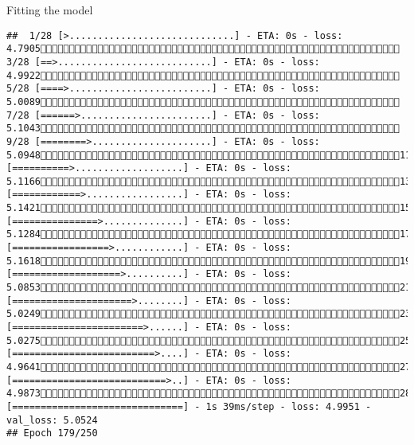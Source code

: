 \documentclass[
  ignorenonframetext,
]{beamer}
\begin{document}
\begin{frame}[fragile]{Fitting the model}
\begin{verbatim}
##  1/28 [>.............................] - ETA: 0s - loss: 4.7905 3/28 [==>...........................] - ETA: 0s - loss: 4.9922 5/28 [====>.........................] - ETA: 0s - loss: 5.0089 7/28 [======>.......................] - ETA: 0s - loss: 5.1043 9/28 [========>.....................] - ETA: 0s - loss: 5.094811/28 [==========>...................] - ETA: 0s - loss: 5.116613/28 [============>.................] - ETA: 0s - loss: 5.142115/28 [===============>..............] - ETA: 0s - loss: 5.128417/28 [=================>............] - ETA: 0s - loss: 5.161819/28 [===================>..........] - ETA: 0s - loss: 5.085321/28 [=====================>........] - ETA: 0s - loss: 5.024923/28 [=======================>......] - ETA: 0s - loss: 5.027525/28 [=========================>....] - ETA: 0s - loss: 4.964127/28 [===========================>..] - ETA: 0s - loss: 4.987328/28 [==============================] - 1s 39ms/step - loss: 4.9951 - val_loss: 5.0524
## Epoch 179/250

\end{verbatim}
\end{frame}
\end{document}
